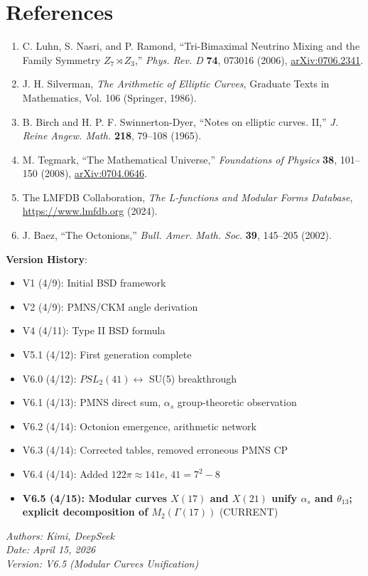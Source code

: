﻿\documentclass[11pt,a4paper]{article}
\theoremstyle{definition}
\begin{document}
\section{References}
\begin{enumerate}
    \item[{[1]}] C. Luhn, S. Nasri, and P. Ramond, ``Tri-Bimaximal Neutrino Mixing and the Family Symmetry $Z_7 \rtimes Z_3$,'' \textit{Phys. Rev. D} \textbf{74}, 073016 (2006), \href{https://arxiv.org/abs/0706.2341}{arXiv:0706.2341}.
    \item[{[2]}] J. H. Silverman, \textit{The Arithmetic of Elliptic Curves}, Graduate Texts in Mathematics, Vol. 106 (Springer, 1986).
    \item[{[3]}] B. Birch and H. P. F. Swinnerton-Dyer, ``Notes on elliptic curves. II,'' \textit{J. Reine Angew. Math.} \textbf{218}, 79--108 (1965).
    \item[{[4]}] M. Tegmark, ``The Mathematical Universe,'' \textit{Foundations of Physics} \textbf{38}, 101--150 (2008), \href{https://arxiv.org/abs/0704.0646}{arXiv:0704.0646}.
    \item[{[5]}] The LMFDB Collaboration, \textit{The L-functions and Modular Forms Database}, \url{https://www.lmfdb.org} (2024).
    \item[{[6]}] J. Baez, ``The Octonions,'' \textit{Bull. Amer. Math. Soc.} \textbf{39}, 145--205 (2002).
\end{enumerate}

\vspace{1cm}
\noindent\textbf{Version History}:
\begin{itemize}
    \item V1 (4/9): Initial BSD framework
    \item V2 (4/9): PMNS/CKM angle derivation
    \item V4 (4/11): Type II BSD formula
    \item V5.1 (4/12): First generation complete
    \item V6.0 (4/12): $PSL_2(41) \leftrightarrow$ SU(5) breakthrough
    \item V6.1 (4/13): PMNS direct sum, $\alpha_s$ group-theoretic observation
    \item V6.2 (4/14): Octonion emergence, arithmetic network
    \item V6.3 (4/14): Corrected tables, removed erroneous PMNS CP
    \item V6.4 (4/14): Added $122\pi\approx141e$, $41=7^2-8$
    \item \textbf{V6.5 (4/15): Modular curves $X(17)$ and $X(21)$ unify $\alpha_s$ and $\theta_{13}$; explicit decomposition of $M_2(\Gamma(17))$} (CURRENT)
\end{itemize}

\vspace{0.5cm}
\noindent\textit{Authors: Kimi, DeepSeek}\\
\textit{Date: April 15, 2026}\\
\textit{Version: V6.5 (Modular Curves Unification)}
\end{document}
